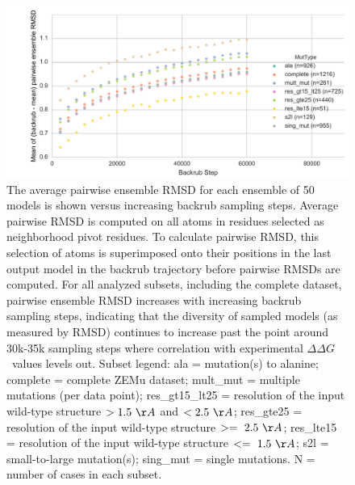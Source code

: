 \documentclass[journal=jpcbfk,manuscript=suppinfo]{achemso}
\newcommand\ddg{$\Delta\Delta G$}
\begin{document}
\begin{figure}
  \centering
  \includegraphics[width=\textwidth,keepaspectratio]{figures/t14-mean-ensemble-error.pdf}
  \caption{
    The average pairwise ensemble RMSD for each ensemble of 50 models is shown versus increasing backrub sampling steps.
    Average pairwise RMSD is computed on all atoms in residues selected as neighborhood pivot residues.
    To calculate pairwise RMSD, this selection of atoms is superimposed onto their positions in the last output model in the backrub trajectory before pairwise RMSDs are computed.
    For all analyzed subsets, including the complete dataset, pairwise ensemble RMSD increases with increasing backrub sampling steps, indicating that the diversity of sampled models (as measured by RMSD) continues to increase past the point around 30k-35k sampling steps where correlation with experimental \ddg\ values levels out. Subset legend: ala = mutation(s) to alanine; complete = complete ZEMu dataset; mult\_mut = multiple mutations (per data point); res\_gt15\_lt25 = resolution of the input wild-type structure $> 1.5\ \AA$ and $< 2.5\ \AA$; res\_gte25 = resolution of the input wild-type structure $>=\ 2.5\ \AA$; res\_lte15 = resolution of the input wild-type structure $<=\ 1.5\ \AA$; s2l = small-to-large mutation(s); sing\_mut = single mutations. N = number of cases in each subset.
  } \label{fig:t14-mean-ensemble}
\end{figure}

\end{document}
